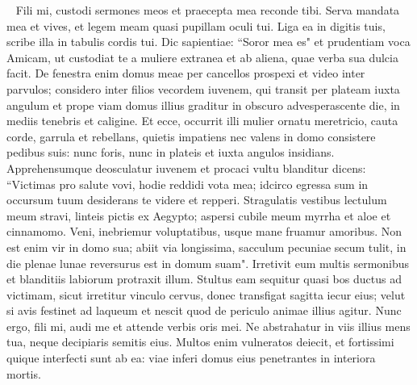 \begin{biblechapter}   
\verse Fili mi, custodi sermones meos et praecepta mea reconde tibi. 
\verse Serva mandata mea et vives, et legem meam quasi pupillam oculi tui. 
\verse Liga ea in digitis tuis, scribe illa in tabulis cordis tui. 
\verse Dic sapientiae: “Soror mea es" et prudentiam voca Amicam, 
\verse ut custodiat te a muliere extranea et ab aliena, quae verba sua dulcia facit. 
\verse De fenestra enim domus meae per cancellos prospexi 
\verse et video inter parvulos; considero inter filios vecordem iuvenem, 
\verse qui transit per plateam iuxta angulum et prope viam domus illius graditur 
\verse in obscuro advesperascente die, in mediis tenebris et caligine. 
\verse Et ecce, occurrit illi mulier ornatu meretricio, cauta corde, garrula et rebellans, 
\verse quietis impatiens nec valens in domo consistere pedibus suis: 
\verse nunc foris, nunc in plateis et iuxta angulos insidians. 
\verse Apprehensumque deosculatur iuvenem et procaci vultu blanditur dicens: 
\verse “Victimas pro salute vovi, hodie reddidi vota mea; 
\verse idcirco egressa sum in occursum tuum desiderans te videre et repperi. 
\verse Stragulatis vestibus lectulum meum stravi, linteis pictis ex Aegypto; 
\verse aspersi cubile meum myrrha et aloe et cinnamomo. 
\verse Veni, inebriemur voluptatibus, usque mane fruamur amoribus. 
\verse Non est enim vir in domo sua; abiit via longissima, 
\verse sacculum pecuniae secum tulit, in die plenae lunae reversurus est in domum suam". 
\verse Irretivit eum multis sermonibus et blanditiis labiorum protraxit illum. 
\verse Stultus eam sequitur quasi bos ductus ad victimam, sicut irretitur vinculo cervus, 
\verse donec transfigat sagitta iecur eius; velut si avis festinet ad laqueum et nescit quod de periculo animae illius agitur. 
\verse Nunc ergo, fili mi, audi me et attende verbis oris mei. 
\verse Ne abstrahatur in viis illius mens tua, neque decipiaris semitis eius. 
\verse Multos enim vulneratos deiecit, et fortissimi quique interfecti sunt ab ea: 
\verse viae inferi domus eius penetrantes in interiora mortis. 
\end{biblechapter}

